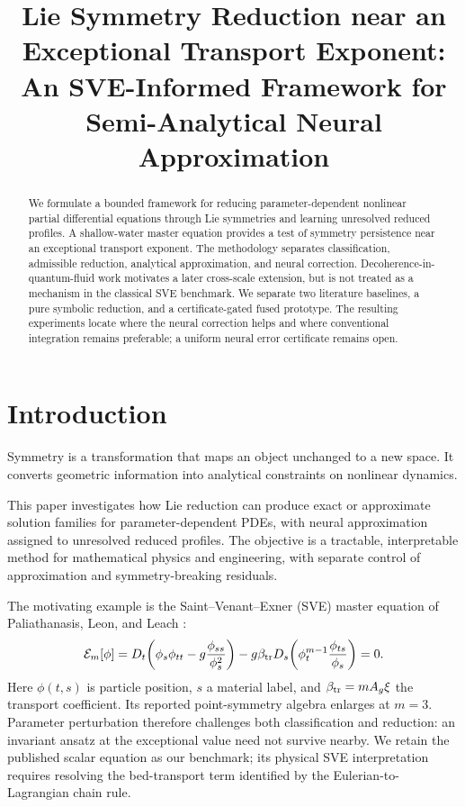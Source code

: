 \documentclass[11pt]{article}
\title{Lie Symmetry Reduction near an Exceptional Transport Exponent:\\
An SVE-Informed Framework for Semi-Analytical Neural Approximation}
\author{}
\date{}
\newcommand{\E}{\mathcal E}
\begin{document}
\maketitle
\begin{abstract}
We formulate a bounded framework for reducing parameter-dependent nonlinear partial
differential equations through Lie symmetries and learning unresolved reduced
profiles. A shallow-water master equation provides a test of symmetry
persistence near an exceptional transport exponent. The methodology separates
classification, admissible reduction, analytical approximation, and neural
correction. Decoherence-in-quantum-fluid work motivates a later cross-scale
extension, but is not treated as a mechanism in the classical SVE benchmark.
We separate two literature baselines, a pure symbolic reduction, and a
certificate-gated fused prototype. The resulting experiments locate where the
neural correction helps and where conventional integration remains preferable;
a uniform neural error certificate remains open.
\end{abstract}

\section{Introduction}
Symmetry is a transformation that maps an object unchanged to a new space. It converts geometric information into analytical constraints on nonlinear
dynamics.

This paper investigates how Lie reduction can produce exact or
approximate solution families for parameter-dependent PDEs, with neural
approximation assigned to unresolved reduced profiles. The objective is a
tractable, interpretable method for mathematical physics and engineering,
with separate control of approximation and symmetry-breaking residuals.

The motivating example is the Saint--Venant--Exner (SVE) master equation of
Paliathanasis, Leon, and Leach \cite{ap}:
\begin{equation}
\E_m[\phi]=D_t\!\left(\phi_s\phi_{tt}-g\frac{\phi_{ss}}{\phi_s^2}\right)
-g\beta_{\rm tr} D_s\!\left(\phi_t^{m-1}\frac{\phi_{ts}}{\phi_s}\right)=0.
\label{eq:sve}
\end{equation}
Here $\phi(t,s)$ is particle position, $s$ a material label, and
$\beta_{\rm tr}=mA_g\xi$
the transport coefficient. Its reported point-symmetry algebra enlarges at
$m=3$. Parameter perturbation therefore challenges both classification and
reduction: an invariant ansatz at the exceptional value need not survive
nearby. We retain the published scalar equation as our benchmark; its physical
SVE interpretation requires resolving the bed-transport term identified by
the Eulerian-to-Lagrangian chain rule.
\end{document}
